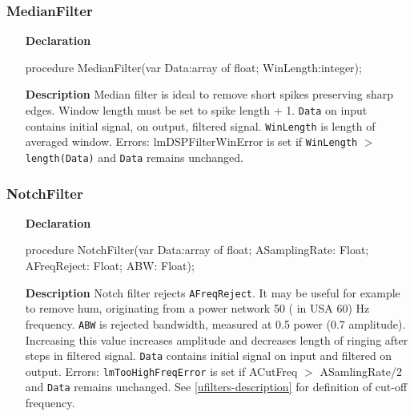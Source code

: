 \documentclass[12pt,a4paper,oneside]{report}
\newcommand{\declarationitem}[1]{\textbf{#1}}
\newcommand{\descriptiontitle}[1]{\textbf{#1}}
\newcommand{\code}[1]{\texttt{#1}}
\begin{document}
\subsubsection{MedianFilter}
\label{ufilters-MedianFilter}
\begin{itemize}
	\item[\declarationitem{Declaration}\hfill]
	\begin{flushleft}
	procedure MedianFilter(var Data:array of float; WinLength:integer);		
	\end{flushleft}
	\item[\descriptiontitle{Description}]
	Median filter is ideal to remove short spikes preserving sharp edges. Window length must be set to spike length + 1. \code{Data} on input contains initial signal, on output, filtered signal. \code{WinLength} is length of averaged window. Errors: lmDSPFilterWinError is set if \code{WinLength} $>$ \code{length(Data)} and \code{Data} remains unchanged. 
\end{itemize}	
\subsubsection{NotchFilter}
\label{ufilters-notchfilter}
\begin{itemize}
	\item[\declarationitem{Declaration}\hfill]
	\begin{flushleft}
procedure NotchFilter(var Data:array of float; ASamplingRate: Float; AFreqReject: Float; ABW: Float);
	\end{flushleft}
	\item[\descriptiontitle{Description}]
	Notch filter rejects \code{AFreqReject}. It may be useful for example to remove hum, originating from a power network 50 ( in USA 60) Hz frequency. \code{ABW} is rejected bandwidth, measured at 0.5 power (0.7 amplitude). Increasing this value increases amplitude and decreases length of ringing after steps in filtered signal. \code{Data} contains initial signal on input and filtered on output. Errors: \code{lmTooHighFreqError} is set if ACutFreq $>$ ASamlingRate/2 and \code{Data} remains unchanged. See \ref{ufilters-description} for definition of cut-off frequency. 
\end{itemize}	
\end{document}
